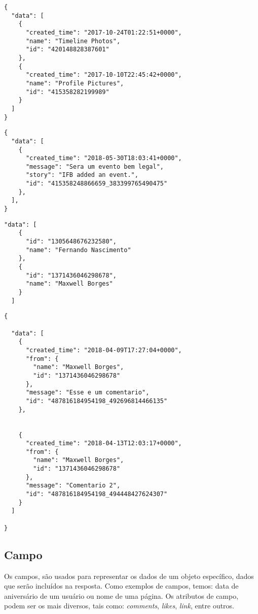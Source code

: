 \begin{lstlisting}[caption={Resposta do servidor as requisições \ref{lst:albunsPagina}, \ref{lst:videosPagina} e \ref{lst:fotosPagina}},label={lst:respostaAlbuns}]
{
  "data": [
    {
      "created_time": "2017-10-24T01:22:51+0000",
      "name": "Timeline Photos",
      "id": "420148828387601"
    },
    {
      "created_time": "2017-10-10T22:45:42+0000",
      "name": "Profile Pictures",
      "id": "415358282199989"
    }
  ]
}
\end{lstlisting}

\begin{lstlisting}[caption={Resposta da requisição \ref{lst:eventosPagina}},label={lst:respostaEventos}]
{
  "data": [
    {
      "created_time": "2018-05-30T18:03:41+0000",
      "message": "Sera um evento bem legal",
      "story": "IFB added an event.",
      "id": "415358248866659_383399765490475"
    },
  ],
}
\end{lstlisting} 

\begin{lstlisting}[caption={Resposta da requisição \ref{lst:curtidasComentario}},label={lst:respostaCurtidas}]
  "data": [
    {
      "id": "1305648676232580",
      "name": "Fernando Nascimento"
    },
    {
      "id": "1371436046298678",
      "name": "Maxwell Borges"
    }
  ]
\end{lstlisting} 

\begin{lstlisting}[caption={Resposta da requisição \ref{lst:comentariosPostagem}},label={lst:respostaComentarios}]
{

  "data": [
    {
      "created_time": "2018-04-09T17:27:04+0000",
      "from": {
        "name": "Maxwell Borges",
        "id": "1371436046298678"
      },
      "message": "Esse e um comentario",
      "id": "487816184954198_492696814466135"
    },
    
    
    {
      "created_time": "2018-04-13T12:03:17+0000",
      "from": {
        "name": "Maxwell Borges",
        "id": "1371436046298678"
      },
      "message": "Comentario 2",
      "id": "487816184954198_494448427624307"
    }
  ]
  
}
\end{lstlisting} 

\subsection{Campo}
Os campos, são usados para representar os dados de um objeto específico, dados que serão incluídos na resposta. Como exemplos de campos, temos: data de aniversário de um usuário ou nome de uma página. Os atributos de campo, podem ser os mais diversos, tais como: \textit{comments}, \textit{likes}, \textit{link}, entre outros. 

